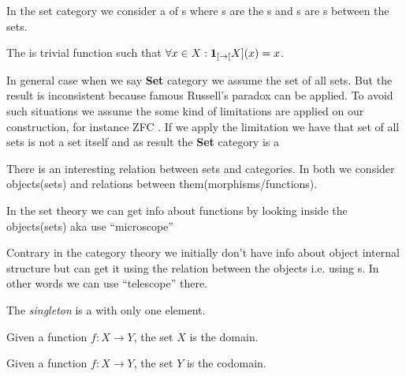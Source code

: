 \begin{example}
  \label{ex:setcategory}
  In the set category we consider a  of
  s where 
  s are the s and
  s are s between the
  sets.

  The  is trivial function such that $\forall x \in
  X: \mathbf{1}_{ [ \to [ }X](x) = x$.

  In general case when we say \textbf{Set} category we assume the set
  of all sets. But the result is inconsistent because famous Russell's
  paradox \cite{wiki:russell_paradox}can be applied. To avoid such
  situations we assume the some 
  kind of limitations are applied on our construction, for instance
  ZFC \cite{wiki:zfc}. If we apply the limitation we have that set of
  all sets is not a set itself and as result the  \textbf{Set}
  category is a 
\end{example}

\begin{remark}
  \label{rem:set_vs_category}
  There is an interesting relation between sets and categories. In both
  we consider objects(sets) and relations between
  them(morphisms/functions). 

  In the set theory we can get info about functions by looking inside
  the objects(sets) aka use ``microscope'' \cite{bib:milewski2018category} 

  Contrary in the category theory we initially don't have info about object
  internal structure but can get it using the relation between the
  objects i.e. using s. In other words we can use
  ``telescope'' \cite{bib:milewski2018category}  there.
\end{remark}

\begin{definition}[Singleton]
\label{def:singleton_set} 
The \textit{singleton} is a  with only one element.
\end{definition}

\begin{definition}[Domain]
  \label{def:domain_set}
  Given a function $f: X \to Y$, the set $X$ is the domain.
\end{definition}

\begin{definition}[Codomain]
  \label{def:codomain_set}
  Given a function $f: X \to Y$, the set $Y$ is the codomain.
\end{definition}


